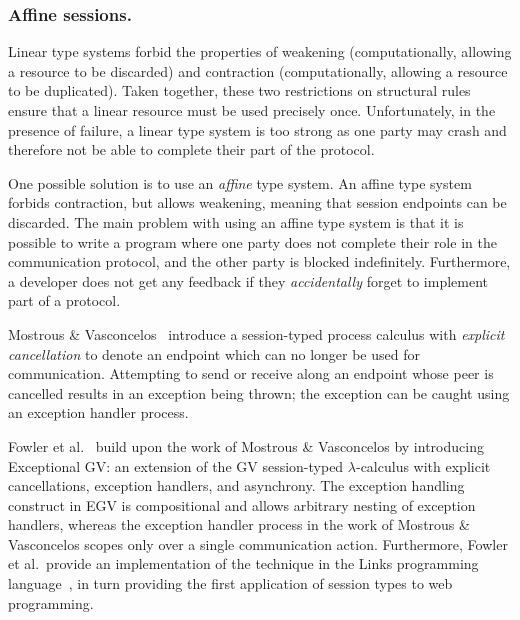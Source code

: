 \documentclass[
graybox,
envcountchap
]{svmult}
\begin{document}
\begin{bibunit}


  \subsubsection{Affine sessions.}

  Linear type systems forbid the properties of weakening (computationally,
  allowing a resource to be discarded) and contraction (computationally,
  allowing a resource to be duplicated).  Taken together, these two restrictions
  on structural rules ensure that a linear resource must be used precisely once.
  Unfortunately, in the presence of failure, a linear type system is too strong
  as one party may crash and therefore not be able to complete their part of the
  protocol.

  One possible solution is to use an \emph{affine} type system. An affine type
  system forbids contraction, but allows weakening,
  meaning that session endpoints can be discarded.
%
  The main problem with using an affine type system is that it is possible to
  write a program where one party does not complete their role in the
  communication protocol, and the other party is blocked indefinitely.
  Furthermore, a developer does not get any feedback if they \emph{accidentally}
  forget to implement part of a protocol.

  Mostrous \& Vasconcelos~\cite{MostrousV18:affine} introduce a session-typed
  process calculus with \emph{explicit cancellation} to denote an endpoint which
  can no longer be used for communication. Attempting to send or receive along
  an endpoint whose peer is cancelled results in an exception being thrown; the
  exception can be caught using an exception handler process.

  Fowler et al.~\cite{FowlerLMD19:stwt} build upon the work of Mostrous \&
  Vasconcelos by introducing Exceptional GV: an extension of the GV
  session-typed $\lambda$-calculus with explicit cancellations, exception
  handlers, and asynchrony. The exception handling construct in EGV is
  compositional and allows arbitrary nesting of exception handlers, whereas the
  exception handler process in the work of Mostrous \& Vasconcelos scopes only
  over a single communication action. Furthermore, Fowler et al.\ provide an
  implementation of the technique in the Links programming
  language~\cite{CooperLWY06:links}, in turn providing the first application of
  session types to web programming.


\end{bibunit}
\end{document}
